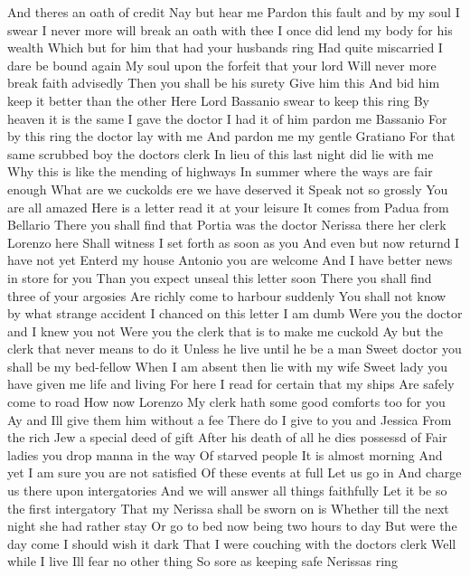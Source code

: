 And theres an oath of credit
Nay but hear me
Pardon this fault and by my soul I swear
I never more will break an oath with thee
I once did lend my body for his wealth
Which but for him that had your husbands ring
Had quite miscarried I dare be bound again
My soul upon the forfeit that your lord
Will never more break faith advisedly
Then you shall be his surety Give him this
And bid him keep it better than the other
Here Lord Bassanio swear to keep this ring
By heaven it is the same I gave the doctor
I had it of him pardon me Bassanio
For by this ring the doctor lay with me
And pardon me my gentle Gratiano
For that same scrubbed boy the doctors clerk
In lieu of this last night did lie with me
Why this is like the mending of highways
In summer where the ways are fair enough
What are we cuckolds ere we have deserved it
Speak not so grossly You are all amazed
Here is a letter read it at your leisure
It comes from Padua from Bellario
There you shall find that Portia was the doctor
Nerissa there her clerk Lorenzo here
Shall witness I set forth as soon as you
And even but now returnd I have not yet
Enterd my house Antonio you are welcome
And I have better news in store for you
Than you expect unseal this letter soon
There you shall find three of your argosies
Are richly come to harbour suddenly
You shall not know by what strange accident
I chanced on this letter
I am dumb
Were you the doctor and I knew you not
Were you the clerk that is to make me cuckold
Ay but the clerk that never means to do it
Unless he live until he be a man
Sweet doctor you shall be my bed-fellow
When I am absent then lie with my wife
Sweet lady you have given me life and living
For here I read for certain that my ships
Are safely come to road
How now Lorenzo
My clerk hath some good comforts too for you
Ay and Ill give them him without a fee
There do I give to you and Jessica
From the rich Jew a special deed of gift
After his death of all he dies possessd of
Fair ladies you drop manna in the way
Of starved people
It is almost morning
And yet I am sure you are not satisfied
Of these events at full Let us go in
And charge us there upon intergatories
And we will answer all things faithfully
Let it be so the first intergatory
That my Nerissa shall be sworn on is
Whether till the next night she had rather stay
Or go to bed now being two hours to day
But were the day come I should wish it dark
That I were couching with the doctors clerk
Well while I live Ill fear no other thing
So sore as keeping safe Nerissas ring
